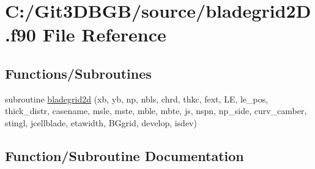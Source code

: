 \hypertarget{bladegrid2_d_8f90}{}\section{C\+:/\+Git3\+D\+B\+G\+B/source/bladegrid2\+D.f90 File Reference}
\label{bladegrid2_d_8f90}
\subsection*{Functions/\+Subroutines}
\begin{DoxyCompactItemize}
\item 
subroutine \hyperlink{bladegrid2_d_8f90_a942de4324f4b58cfa677173c90eae2b6}{bladegrid2d} (xb, yb, np, nbls, chrd, thkc, fext, L\+E, le\+\_\+pos, thick\+\_\+distr,                                                                                       casename, msle, mste, mble, mbte, js, nspn, np\+\_\+side,                                                                                       curv\+\_\+camber, stingl, jcellblade, etawidth, B\+Ggrid, develop, isdev)
\end{DoxyCompactItemize}


\subsection{Function/\+Subroutine Documentation}
\hypertarget{bladegrid2_d_8f90_a942de4324f4b58cfa677173c90eae2b6}{}
